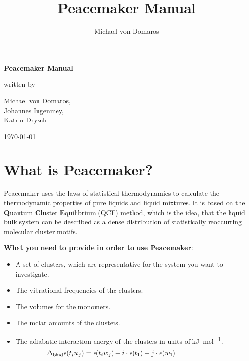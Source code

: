 \documentclass{scrartcl}
\begin{document}


\title{Peacemaker Manual}
\author{Michael von Domaros}
\begin{titlepage}
    \centering
    \Large

    \vspace*{5ex}
    \textbf{\Huge Peacemaker Manual}

    \vspace{\fill}
    written by
    
    \vspace{1ex}
    Michael von Domaros,\\
    Johannes Ingenmey,\\
    Katrin Drysch
    
    \vspace{2ex}
    \today
    \vspace{\fill}
\end{titlepage}

\tableofcontents
\pagebreak

\section{What is Peacemaker?}
\label{sec:peacemaker}
Peacemaker uses the laws of statistical thermodynamics to calculate the thermodynamic properties of
pure liquids and liquid mixtures.
It is based on the \textbf{Q}uantum \textbf{C}luster \textbf{E}quilibrium (QCE) method, which is 
the idea, that the liquid bulk system can be described as a dense distribution of statistically
reoccurring molecular cluster motifs.

\textbf{What you need to provide in order to use Peacemaker:}\vspace{-0.2cm}
\begin{itemize}[noitemsep]
    \item A set of clusters, which are representative for the system you want to investigate.
    \item The vibrational frequencies of the clusters.
    \item The volumes for the monomers.
    \item The molar amounts of the clusters.
    \item The adiabatic interaction energy of the clusters in units of \si{\kilo\joule\per\mole}.\vspace{-0.2cm}
    \begin{equation*}
        \hspace{-2.2cm}\Delta_\mathrm{bind} \epsilon(t_i w_j) = \epsilon(t_i w_j) - i \cdot \epsilon(t_1) - j \cdot \epsilon(w_1)
    \end{equation*}
\end{itemize}\vspace{-0.2cm}
\end{document}
